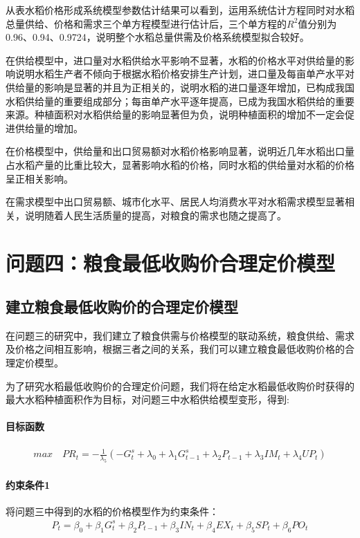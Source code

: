 \documentclass[withoutpreface,bwprint]{cumcmthesis} %
\begin{document}
从表水稻价格形成系统模型参数估计结果可以看到，运用系统估计方程同时对水稻
总量供给、价格和需求三个单方程模型进行估计后，三个单方程的$R^2$值分别为 0.96、0.94、0.9724，说明整个水稻总量供需及价格系统模型拟合较好。\par
在供给模型中，进口量对水稻供给水平影响不显著，水稻的价格水平对供给量的影响说明水稻生产者不倾向于根据水稻价格安排生产计划，进口量及每亩单产水平对供给量的影响是显著的并且为正相关的，说明水稻的进口量逐年增加，已构成我国水稻供给量的重要组成部分；每亩单产水平逐年提高，已成为我国水稻供给的重要来源。种植面积对水稻供给量的影响显著但为负，说明种植面积的增加不一定会促进供给量的增加。\par
在价格模型中，供给量和出口贸易额对水稻价格影响显著，说明近几年水稻出口量占水稻产量的比重比较大，显著影响水稻的价格，同时水稻的供给量对水稻的价格呈正相关影响。\par
在需求模型中出口贸易额、城市化水平、居民人均消费水平对水稻需求模型显著相关，说明随着人民生活质量的提高，对粮食的需求也随之提高了。\par
\section{问题四：粮食最低收购价合理定价模型}
\subsection{建立粮食最低收购价的合理定价模型}	
在问题三的研究中，我们建立了粮食供需与价格模型的联动系统，粮食供给、需求及价格之间相互影响，根据三者之间的关系，我们可以建立粮食最低收购价格的合理定价模型。\par
为了研究水稻最低收购价的合理定价问题，我们将在给定水稻最低收购价时获得的最大水稻种植面积作为目标，对问题三中水稻供给模型变形，得到:
\paragraph{目标函数}
\begin{gather}
max\quad PR_{t}=-\frac{1}{\lambda_{5}}(-G_{t}^{s}+\lambda_{0}+\lambda_{1}G_{t-1}^{s}+\lambda_{2}P_{t-1}+\lambda_{3}IM_{t}+\lambda_{4}UP_{t})
\end{gather}
\paragraph{约束条件1}
将问题三中得到的水稻的价格模型作为约束条件：
\begin{gather}
P_{t}=\beta_{0}+\beta_{1}G_{t}^{s}+\beta_{2}P_{t-1}+\beta_{3}IN_{t}+\beta_{4}EX_{t}+\beta_{5}SP_{t}+\beta_{6}PO_{t}
\end{gather}	
\end{document}
